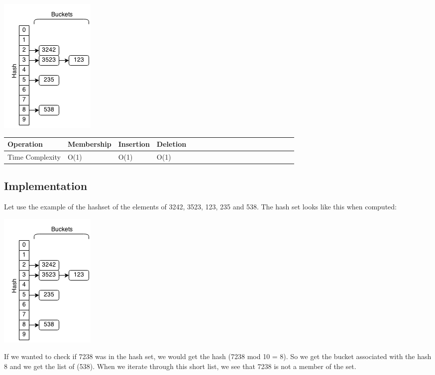 \documentclass[11pt,oneside]{book}
\makeatletter
\def\maxwidth#1{\ifdim\Gin@nat@width>#1 #1\else\Gin@nat@width\fi}
\makeatother
\begin{document}
\includegraphics[width=\maxwidth{\textwidth}]{hashset.png}

\vspace{10pt} \begin{tabulary}{0.4\linewidth}{|l|l|l|l|l|l|l|l|l|l|l|l|l|l|l|l|l|l|l}\hline


  Operation &
  Membership &
  Insertion &
  Deletion\\
\hline


  Time Complexity &
  O(1) &
  O(1) &
  O(1)\\

\hline\end{tabulary}

\subsection{Implementation}

Let use the example of the hashset of the elements of 3242, 3523, 123, 235 and 538. The hash set looks like this when computed:

\includegraphics[width=\maxwidth{\textwidth}]{hashset.png}

If we wanted to check if 7238 was in the hash set, we would get the hash (7238 mod 10 = 8). So we get the bucket associated with the hash 8 and we get the list of (538). When we iterate through this short list, we see that 7238 is not a member of the set.
\end{document}

